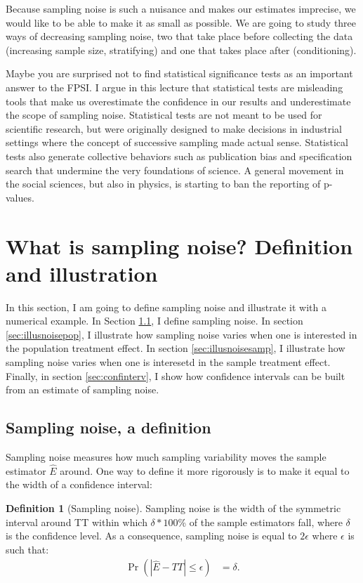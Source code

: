 \documentclass[
]{book}
\theoremstyle{definition}
\newtheorem{definition}{Definition}[chapter]
\theoremstyle{definition}
\theoremstyle{definition}
\theoremstyle{definition}
\theoremstyle{remark}
\begin{document}
Because sampling noise is such a nuisance and makes our estimates imprecise, we would like to be able to make it as small as possible.
We are going to study three ways of decreasing sampling noise, two that take place before collecting the data (increasing sample size, stratifying) and one that takes place after (conditioning).

Maybe you are surprised not to find statistical significance tests as an important answer to the FPSI.
I argue in this lecture that statistical tests are misleading tools that make us overestimate the confidence in our results and underestimate the scope of sampling noise.
Statistical tests are not meant to be used for scientific research, but were originally designed to make decisions in industrial settings where the concept of successive sampling made actual sense.
Statistical tests also generate collective behaviors such as publication bias and specification search that undermine the very foundations of science.
A general movement in the social sciences, but also in physics, is starting to ban the reporting of p-values.

\hypertarget{sec:sampnoise}{%
\section{What is sampling noise? Definition and illustration}\label{sec:sampnoise}}

In this section, I am going to define sampling noise and illustrate it with a numerical example.
In Section \ref{sec:definitionnoise}, I define sampling noise.
In section \ref{sec:illusnoisepop}, I illustrate how sampling noise varies when one is interested in the population treatment effect.
In section \ref{sec:illusnoisesamp}, I illustrate how sampling noise varies when one is interesetd in the sample treatment effect.
Finally, in section \ref{sec:confinterv}, I show how confidence intervals can be built from an estimate of sampling noise.

\hypertarget{sec:definitionnoise}{%
\subsection{Sampling noise, a definition}\label{sec:definitionnoise}}

Sampling noise measures how much sampling variability moves the sample estimator \(\hat{E}\) around.
One way to define it more rigorously is to make it equal to the width of a confidence interval:

\begin{definition}[Sampling noise]
\protect\hypertarget{def:sampnoise}{}{\label{def:sampnoise} \iffalse (Sampling noise) \fi{} }Sampling noise is the width of the symmetric interval around TT within which \(\delta*100\)\% of the sample estimators fall, where \(\delta\) is the confidence level.
As a consequence, sampling noise is equal to \(2\epsilon\) where \(\epsilon\) is such that:
\begin{align*}
\Pr(|\hat{E}-TT|\leq\epsilon) &= \delta.
\end{align*}
\end{definition}
\end{document}
